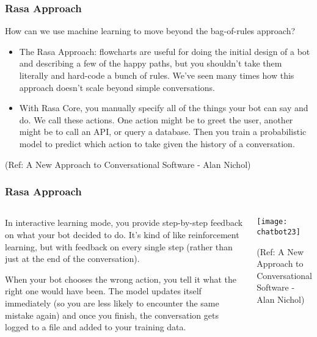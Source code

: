  \begin{frame}[fragile]\frametitle{Rasa Approach}
 
 How can we use machine learning to move beyond the bag-of-rules approach?
 
\begin{itemize}
\item The Rasa Approach: flowcharts are useful for doing the initial design of a bot and describing a few of the happy paths, but you shouldn’t take them literally and hard-code a bunch of rules. We’ve seen many times how this approach doesn’t scale beyond simple conversations.
\item With Rasa Core, you manually specify all of the things your bot can say and do. We call these actions. One action might be to greet the user, another might be to call an API, or query a database. Then you train a probabilistic model to predict which action to take given the history of a conversation.
\end{itemize}

{\tiny (Ref: A New Approach to Conversational Software - Alan Nichol)}


\end{frame}

 \begin{frame}[fragile]\frametitle{Rasa Approach}
 
\begin{columns}
\begin{column}[T]{0.5\linewidth}

In interactive learning mode, you provide step-by-step feedback on what your bot decided to do. It’s kind of like reinforcement learning, but with feedback on every single step (rather than just at the end of the conversation).

When your bot chooses the wrong action, you tell it what the right one would have been. The model updates itself immediately (so you are less likely to encounter the same mistake again) and once you finish, the conversation gets logged to a file and added to your training data.
\end{column}
\begin{column}[T]{0.5\linewidth}

\begin{center}
\texttt{[image: chatbot23]}

\end{center}

{\tiny (Ref: A New Approach to Conversational Software - Alan Nichol)}

\end{column}
\end{columns}
\end{frame}

